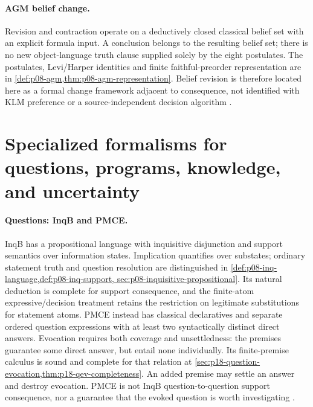 \paragraph{AGM belief change.}
\label{entry:p14-directory-agm}
Revision and contraction operate on a deductively closed classical belief
set with an explicit formula input. A conclusion belongs to the resulting
belief set; there is no new object-language truth clause supplied solely
by the eight postulates. The postulates, Levi/Harper identities and finite
faithful-preorder representation are in
\cref{def:p08-agm,thm:p08-agm-representation}. Belief revision is therefore
located here as a formal change framework adjacent to consequence, not
identified with KLM preference or a source-independent decision algorithm
\cite{AlchourronGardenforsMakinson1985,KatsunoMendelzon1991}.

\section{Specialized formalisms for questions, programs, knowledge, and uncertainty}
\label{sec:p14-directory-specialized}

\paragraph{Questions: InqB and PMCE.}
\label{entry:p14-directory-questions}
InqB has a propositional language with inquisitive disjunction and support
semantics over information states. Implication quantifies over substates;
ordinary statement truth and question resolution are distinguished in
\cref{def:p08-inq-language,def:p08-inq-support,
sec:p08-inquisitive-propositional}. Its natural deduction is complete for
support consequence, and the finite-atom expressive/decision treatment
retains the restriction on legitimate substitutions for statement atoms.
PMCE instead has classical declaratives and separate ordered question
expressions with at least two syntactically distinct direct answers.
Evocation requires both coverage and unsettledness: the premises guarantee
some direct answer, but entail none individually. Its finite-premise calculus
is sound and complete for that relation at
\cref{sec:p18-question-evocation,thm:p18-qev-completeness}.
An added premise may settle an answer and destroy evocation. PMCE is not
InqB question-to-question support consequence, nor a guarantee that the
evoked question is worth investigating
\cite{Ciardelli2023InquisitivePropositional,Wisniewski2016QuestionEvocation}.


